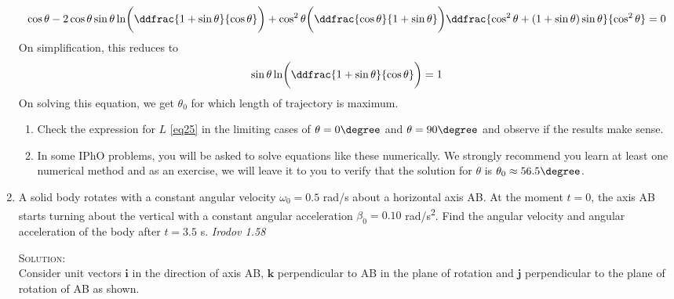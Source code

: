 \begin{enumerate}
\begin{equation*}
\cos\theta - 2\cos\theta\sin\theta\ln\biggl(\ddfrac{1+\sin\theta}{\cos\theta} \biggr) + \cos^2\theta \biggl(\ddfrac{\cos\theta}{1+\sin\theta} \biggr)\ddfrac{\cos^2\theta+(1+\sin\theta)\sin\theta}{\cos^2\theta}=0
\end{equation*}
On simplification, this reduces to 
\begin{equation*}
\sin\theta\ln\biggl(\ddfrac{1+\sin\theta}{\cos\theta} \biggr)=1
\end{equation*}
On solving this equation, we get $\theta_0$ for which length of trajectory is maximum.
\begin{note}
\begin{enumerate}
\item Check the expression for $L$ \eqref{eq25} in the limiting cases of $\theta=0\degree$ and $\theta=90\degree$ and observe if the results make sense.
\item In some IPhO problems, you will be asked to solve equations like these numerically. We strongly recommend you learn at least one numerical method and as an exercise, we will leave it to you to verify that the solution for $\theta$ is $\theta_0\approx56.5\degree$.
\end{enumerate}
\end{note}

\item A solid body rotates with a constant angular velocity $\omega_0=0.5$ rad/s about a horizontal axis AB. At the moment $t=0$, the axis AB starts turning about the vertical with a constant angular acceleration $\beta_0=0.10$ \si{rad/s^2}. Find the angular velocity and angular acceleration of the body after $t=3.5$ s. \hfill \textsl{Irodov 1.58} 

\textsc{Solution:}\\
Consider unit vectors $\mathbf{i}$ in the direction of axis AB, $\mathbf{k}$ perpendicular to AB in the plane of rotation and $\mathbf{j}$ perpendicular to the plane of rotation of AB as shown.

\begin{figure}[hbt]
    \centering
    
\end{figure}


\end{enumerate}
